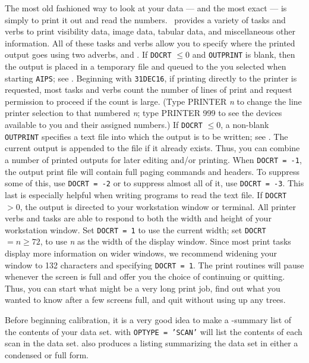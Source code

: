      The most old fashioned way to look at your data --- and the most
exact --- is simply to print it out and read the numbers.  \AIPS\
provides a variety of tasks and verbs to print visibility data, image
data, tabular data, and miscellaneous other information.  All of these
tasks and verbs allow you to specify where the printed output goes
using two adverbs, {\tt \tndx{DOCRT}} and {\tt \tndx{OUTPRINT}}\@.  If
{\tt DOCRT} $\le 0$ and {\tt OUTPRINT} is blank, then the output is
placed in a temporary file and queued to the \indx{printer} you
selected when starting {\tt AIPS}; see .  Beginning with
{\tt 31DEC16}, if printing directly to the printer is requested, most
tasks and verbs count the number of lines of print and request
permission to proceed if the count is large.  (Type {\us PRINTER {\it
n\/} \CR} to change the line printer selection to that numbered {\it
n\/}; type {\us PRINTER 999 \CR} to see the devices available to you
and their assigned numbers.)  If {\tt DOCRT} $\le 0$, a non-blank {\tt
OUTPRINT} specifies a text file into which the output is to be
written; see .  The current output is appended to the
file if it already exists.  Thus, you can combine a number of printed
outputs for later editing and/or printing.  When {\tt DOCRT = -1}, the
output print file will contain full paging commands and headers.  To
suppress some of this, use {\tt DOCRT = -2} or to suppress almost all
of it, use {\tt DOCRT = -3}.  This last is especially helpful when
writing programs to read the text file.  If {\tt DOCRT} $> 0$, the
output is directed to your workstation window or terminal.  All
printer verbs and tasks are able to respond to both the width and
height of your workstation window.  Set {\tt DOCRT = 1} to use the
current width; set {\tt DOCRT} $= n \ge 72$, to use {\it n\/} as the
width of the display window.  Since most print tasks display more
information on wider windows, we recommend widening your window to 132
characters and specifying {\tt DOCRT = 1}.  The print routines will
pause whenever the screen is full and offer you the choice of
continuing or quitting.  Thus, you can start what might be a very long
print job, find out what you wanted to know after a few screens full,
and quit without using up any trees.


     Before beginning calibration, it is a very good idea to make a
-summary list of the contents of your data set.  {\tt \tndx{LISTR}}
with {\tt OPTYPE = 'SCAN'} will list the contents of each scan in the
data set. {\tt \tndx{DTSUM}} also produces a listing summarizing the
data set in either a condensed or full form.

